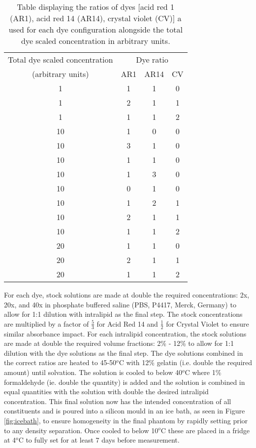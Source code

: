 \begin{table}[ht!]
    \centering
    \caption{Table displaying the ratios of dyes [acid red 1 (AR1), acid red 14 (AR14), crystal violet (CV)] a used for each dye configuration alongside the total dye scaled concentration in arbitrary units.}
    \begin{tabular}{|c|c|c|c|}
        \hline
        Total dye scaled concentration & \multicolumn{3}{|c|}{Dye ratio} \\
        (arbitrary units) & AR1 & AR14 & CV \\
        \hline
        1 & 1 & 1 & 0 \\
        1 & 2 & 1 & 1 \\
        1 & 1 & 1 & 2 \\
        10 & 1 & 0 & 0 \\
        10 & 3 & 1 & 0 \\
        10 & 1 & 1 & 0 \\
        10 & 1 & 3 & 0 \\
        10 & 0 & 1 & 0 \\
        10 & 1 & 2 & 1 \\
        10 & 2 & 1 & 1 \\
        10 & 1 & 1 & 2 \\
        20 & 1 & 1 & 0 \\
        20 & 2 & 1 & 1 \\
        20 & 1 & 1 & 2 \\
        \hline
    \end{tabular}
    \label{tb:phantomratios}
\end{table}

\label{sec:methodsphantomsynthesis}
For each dye, stock solutions are made at double the required concentrations: 2x, 20x, and 40x in phosphate buffered saline (PBS, P4417, Merck, Germany) to allow for 1:1 dilution with intralipid as the final step. The stock concentrations are multiplied by a factor of $\frac{5}{3}$ for Acid Red 14 and $\frac{1}{2}$ for Crystal Violet to ensure similar absorbance impact. For each intralipid concentration, the stock solutions are made at double the required volume fractions: 2\% - 12\% to allow for 1:1 dilution with the dye solutions as the final step. The dye solutions combined in the correct ratios are heated to 45-50$^o$C with 12\% gelatin (i.e. double the required amount) until solvation. The solution is cooled to below 40$^o$C where 1\% formaldehyde (ie. double the quantity) is added and the solution is combined in equal quantities with the solution with double the desired intralipid concentration. This final solution now has the intended concentration of all constituents and is poured into a silicon mould in an ice bath, as seen in Figure \ref{fig:icebath}, to ensure homogeneity in the final phantom by rapidly setting prior to any density separation. Once cooled to below 10$^o$C these are placed in a fridge at 4$^o$C to fully set for at least 7 days before measurement. 

